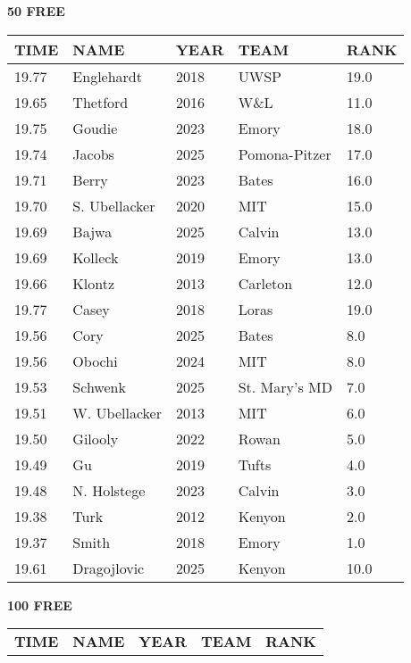 \begin{table}[H]
\centering
\begin{minipage}[t]{0.48\textwidth}
\centering
\textbf{50 FREE}\\[0.1cm]
\begin{tabular}{@{}p{1.8cm}p{2.8cm}p{1.2cm}p{1.4cm}p{0.8cm}@{}}
\hline
    \textbf{TIME} & \textbf{NAME} & \textbf{YEAR} & \textbf{TEAM} & \textbf{RANK} \\
\hline
    19.77 & Englehardt & 2018 & UWSP & 19.0 \\
    19.65 & Thetford & 2016 & W\&L & 11.0 \\
    19.75 & Goudie & 2023 & Emory & 18.0 \\
    19.74 & Jacobs & 2025 & Pomona-Pitzer & 17.0 \\
    19.71 & Berry & 2023 & Bates & 16.0 \\
    19.70 & S. Ubellacker & 2020 & MIT & 15.0 \\
    19.69 & Bajwa & 2025 & Calvin & 13.0 \\
    19.69 & Kolleck & 2019 & Emory & 13.0 \\
    19.66 & Klontz & 2013 & Carleton & 12.0 \\
    19.77 & Casey & 2018 & Loras & 19.0 \\
    19.56 & Cory & 2025 & Bates & 8.0 \\
    19.56 & Obochi & 2024 & MIT & 8.0 \\
    19.53 & Schwenk & 2025 & St. Mary's MD & 7.0 \\
    19.51 & W. Ubellacker & 2013 & MIT & 6.0 \\
    19.50 & Gilooly & 2022 & Rowan & 5.0 \\
    19.49 & Gu & 2019 & Tufts & 4.0 \\
    19.48 & N. Holstege & 2023 & Calvin & 3.0 \\
    19.38 & Turk & 2012 & Kenyon & 2.0 \\
    19.37 & Smith & 2018 & Emory & 1.0 \\
    19.61 & Dragojlovic & 2025 & Kenyon & 10.0 \\
\hline
\end{tabular}
\end{minipage}\hfill
\begin{minipage}[t]{0.48\textwidth}
\centering
\textbf{100 FREE}\\[0.1cm]
\begin{tabular}{@{}p{1.8cm}p{2.8cm}p{1.2cm}p{1.4cm}p{0.8cm}@{}}
\hline
    \textbf{TIME} & \textbf{NAME} & \textbf{YEAR} & \textbf{TEAM} & \textbf{RANK} \\

\end{tabular}
\end{minipage}
\end{table}
